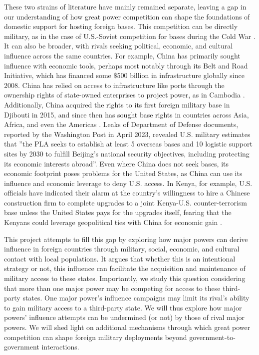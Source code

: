 These two strains of literature have mainly remained separate, leaving a gap in our understanding of how great power competition can shape the foundations of domestic support for hosting foreign bases. This competition can be directly military, as in the case of U.S.-Soviet competition for bases during the Cold War \cite{Nieman2020,Harkavy1982}. It can also be broader, with rivals seeking political, economic, and cultural influence across the same countries. For example, China has primarily sought influence with economic tools, perhaps most notably through its Belt and Road Initiative, which has financed some \$500 billion in infrastructure globally since 2008. China has relied on access to infrastructure like ports through the ownership rights of state-owned enterprises to project power, as in Cambodia \cite{kardon2022,kardon2022pier}. Additionally, China acquired the rights to its first foreign military base in Djibouti in 2015, and since then has sought base rights in countries across Asia, Africa, and even the Americas \cite{hudson2023,strobel2023}. Leaks of Department of Defense documents, reported by the Washington Post in April 2023, revealed U.S. military estimates that ''the PLA seeks to establish at least 5 overseas bases and 10 logistic support sites by 2030 to fulfill Beijing's national security objectives, including protecting its economic interests abroad''\cite{hudson2023}. Even where China does not seek bases, its economic footprint poses problems for the United States, as China can use its influence and economic leverage to deny U.S. access. In Kenya, for example, U.S. officials have indicated their alarm at the country's willingness to hire a Chinese construction firm to complete upgrades to a joint Kenya-U.S. counter-terrorism base unless the United States pays for the upgrades itself, fearing that the Kenyans could leverage geopolitical ties with China for economic gain \cite{philips2023}.

This project attempts to fill this gap by exploring how major powers can derive influence in foreign countries through military, social, economic, and cultural contact with local populations. It argues that whether this is an intentional strategy or not, this influence can facilitate the acquisition and maintenance of military access to these states. Importantly, we study this question considering that more than one major power may be competing for access to these third-party states. One major power's influence campaigns may limit its rival's ability to gain military access to a third-party state. We will thus explore how major powers' influence attempts can be undermined (or not) by those of rival major powers. We will shed light on additional mechanisms through which great power competition can shape foreign military deployments beyond government-to-government interactions. 

